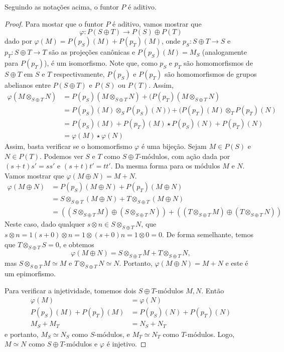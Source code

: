 \begin{lemma}\label{lema324}
Seguindo as notações acima, o funtor $P$ é aditivo.
\begin{proof}
Para mostar que o funtor $P$ é aditivo, vamos mostrar que \[\varphi: P(S\oplus T) \rightarrow P(S) \oplus P(T)\] dado por $\varphi(M)=P(p_S)(M) + P(p_T)(M)$, onde $p_S:S\oplus T \rightarrow S$ e $p_T:S \oplus T \rightarrow T$ são as projeções canônicas e $P(p_S)(M) = M_S$ (analogamente para $P(p_T)$), é um isomorfismo. Note que, como $p_S$ e $p_T$ são homomorfismos de $S\oplus T$ em $S$ e $T$ respectivamente, $P(p_S)$ e $P(p_T)$ são homomorfismos de grupos abelianos entre $P(S\oplus T)$ e $P(S)$ ou $P(T)$. Assim, 
\begin{align*}
    \varphi(M\otimes_{S\oplus T} N) &= P(p_S)(M\otimes_{S\oplus T} N) + (P(p_T)(M\otimes_{S\oplus T} N) \\
    &= P(p_S)(M)\otimes_{S} P(p_S)(N)) + (P(p_T)(M)\otimes_{T} P(p_T)(N) \\
    &= P(p_S)(M) + P(p_T)(M)\star P(p_S)(N) + P(p_T)(N) \\
    &=\varphi(M)\star \varphi(N)
\end{align*}
Assim, basta verificar se o homomorfismo $\varphi$ é uma bijeção. Sejam $M \in P(S)$ e $N\in P(T)$. Podemos ver $S$ e $T$ como $S\oplus T$-módulos, com ação dada por $(s + t)s' = ss'$ e $(s+t)t' = tt'$. Da mesma forma para os módulos $M$ e $N$. Vamos mostrar que $\varphi(M\oplus N) = M + N$.
\begin{align*}
    \varphi(M\oplus N) &= P(p_S)(M\oplus N) + P(p_T)(M\oplus N) \\
    &= S\otimes_{S\oplus T}(M\oplus N) + T\otimes_{S\oplus T}(M\oplus N) \\
    &=\left((S\otimes_{S\oplus T} M) \oplus (S \otimes_{S\oplus T} N)\right) + \left((T\otimes_{S\oplus T} M) \oplus (T \otimes_{S\oplus T} N)\right)
\end{align*}
Neste caso, dado qualquer $s\otimes n \in S \otimes_{S\oplus T} N$, que $s\otimes n = 1(s+0) \otimes n = 1 \otimes (s+0) n = 1 \otimes 0 = 0$. De forma semelhante, temos que $T\otimes_{S\oplus T} S = 0$, e obtemos \[\varphi(M\oplus N) = S\otimes_{S\oplus T}M + T\otimes_{S\oplus T} N,\]
mas $S\otimes_{S\oplus T} M \simeq M$ e $T \otimes_{S\oplus T} N \simeq N$. Portanto, $\varphi(M\oplus N) = M + N$ e este é um epimorfismo. \par 
Para verificar a injetividade, tomemos dois $S\oplus T$-módulos  $M, N$. Então
\begin{align*}
    \varphi(M) &= \varphi(N) \\
    P(p_S)(M) + P(p_T)(M) &= P(p_S)(N) + P(p_T)(N) \\
    M_S + M_T &= N_S + N_T
\end{align*}
e portanto, $M_S \simeq N_S$ como $S$-módulos, e $M_T \simeq N_T$ como $T$-módulos. Logo, $M \simeq N$ como $S\oplus T$-módulos e $\varphi$ é injetivo.
\end{proof}
\end{lemma}
